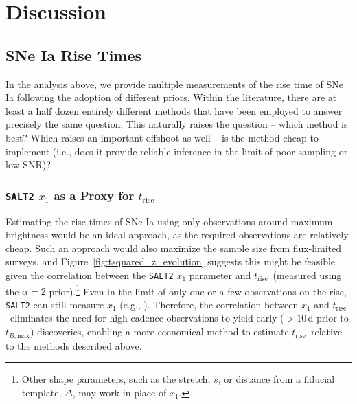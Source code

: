 \documentclass[twocolumn]{aastex63}
\newcommand{\trise}{$t_\mathrm{rise}$}
\newcommand{\tbmax}{$t_{B,\mathrm{max}}$}
\begin{document}
\section{Discussion}

\subsection{SNe Ia Rise Times}

In the analysis above, we provide multiple measurements of the rise time of SNe
Ia following the adoption of different priors. Within the literature, there are
at least a half dozen entirely different methods that have been employed to
answer precisely the same question. This naturally raises the question -- which
method is best? Which raises an important offshoot as well -- is the method
cheap to implement (i.e., does it provide reliable inference in the limit of
poor sampling or low SNR)?

\subsubsection{\texttt{SALT2} $x_1$ as a Proxy for \trise}\label{sec:x1_rise}

Estimating the rise times of SNe Ia using only observations around maximum
brightness would be an ideal approach, as the required observations are
relatively cheap. Such an approach would also maximize the sample size from
flux-limited surveys, and Figure~\ref{fig:tsquared_z_evolution} suggests this
might be feasible given the correlation between the \texttt{SALT2} $x_1$
parameter and \trise\ (measured using the $\alpha = 2$ prior).\footnote{Other
shape parameters, such as the stretch, $s$, or distance from a fiducial
template, $\Delta$, may work in place of $x_1$.} Even in the limit of only one
or a few observations on the rise, \texttt{SALT2} can still measure $x_1$
(e.g., \citealt{Scolnic18a}). Therefore, the correlation between $x_1$ and
\trise\ eliminates the need for high-cadence observations to yield early ($>
10$\,d prior to \tbmax) discoveries, enabling a more economical method to
estimate \trise\ relative to the methods described above.
\end{document}
